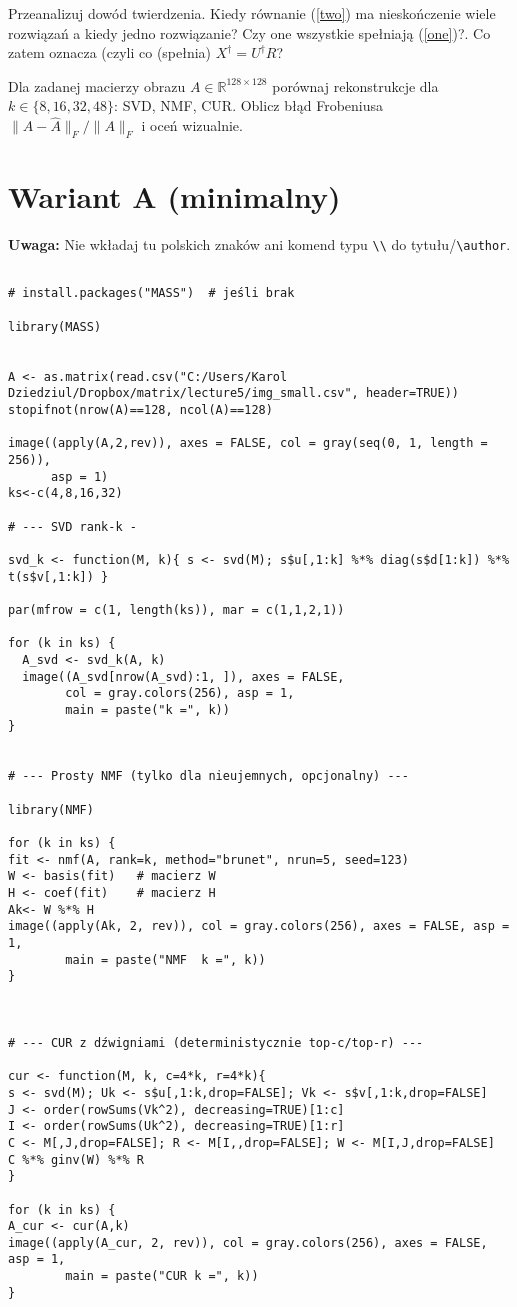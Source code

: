 \documentclass[12pt]{article}
\newcommand{\R}{\mathbb{R}}
\begin{document}
Przeanalizuj dowód twierdzenia. Kiedy równanie (\ref{two}) ma nieskończenie wiele rozwiązań a kiedy jedno rozwiązanie? Czy one wszystkie spełniają (\ref{one})?. Co zatem oznacza (czyli co (spełnia) $X^\dagger=U^\dagger R$?

Dla zadanej macierzy obrazu $A\in\R^{128\times128}$ porównaj rekonstrukcje dla $k\in\{8,16,32,48\}$: SVD, NMF, CUR. Oblicz błąd Frobeniusa $\lVert A-\widehat A\rVert_F/\lVert A\rVert_F$ i oceń wizualnie.

\section{Wariant A (minimalny)}
\noindent\textbf{Uwaga:} Nie wkładaj tu polskich znaków ani komend typu \verb|\\| do tytułu/\verb|\author|.

\begin{verbatim}

# install.packages("MASS")  # jeśli brak

library(MASS)


A <- as.matrix(read.csv("C:/Users/Karol Dziedziul/Dropbox/matrix/lecture5/img_small.csv", header=TRUE))
stopifnot(nrow(A)==128, ncol(A)==128)

image((apply(A,2,rev)), axes = FALSE, col = gray(seq(0, 1, length = 256)),
      asp = 1)
ks<-c(4,8,16,32)

# --- SVD rank-k -

svd_k <- function(M, k){ s <- svd(M); s$u[,1:k] %*% diag(s$d[1:k]) %*% t(s$v[,1:k]) }

par(mfrow = c(1, length(ks)), mar = c(1,1,2,1))

for (k in ks) {
  A_svd <- svd_k(A, k)
  image((A_svd[nrow(A_svd):1, ]), axes = FALSE,
        col = gray.colors(256), asp = 1,
        main = paste("k =", k))
}


# --- Prosty NMF (tylko dla nieujemnych, opcjonalny) ---

library(NMF)

for (k in ks) {
fit <- nmf(A, rank=k, method="brunet", nrun=5, seed=123)
W <- basis(fit)   # macierz W
H <- coef(fit)    # macierz H
Ak<- W %*% H
image((apply(Ak, 2, rev)), col = gray.colors(256), axes = FALSE, asp = 1,
        main = paste("NMF  k =", k))
}



# --- CUR z dźwigniami (deterministycznie top-c/top-r) ---

cur <- function(M, k, c=4*k, r=4*k){
s <- svd(M); Uk <- s$u[,1:k,drop=FALSE]; Vk <- s$v[,1:k,drop=FALSE]
J <- order(rowSums(Vk^2), decreasing=TRUE)[1:c]
I <- order(rowSums(Uk^2), decreasing=TRUE)[1:r]
C <- M[,J,drop=FALSE]; R <- M[I,,drop=FALSE]; W <- M[I,J,drop=FALSE]
C %*% ginv(W) %*% R
}

for (k in ks) {
A_cur <- cur(A,k)
image((apply(A_cur, 2, rev)), col = gray.colors(256), axes = FALSE, asp = 1,
        main = paste("CUR k =", k))
}


\end{verbatim}
\end{document}
